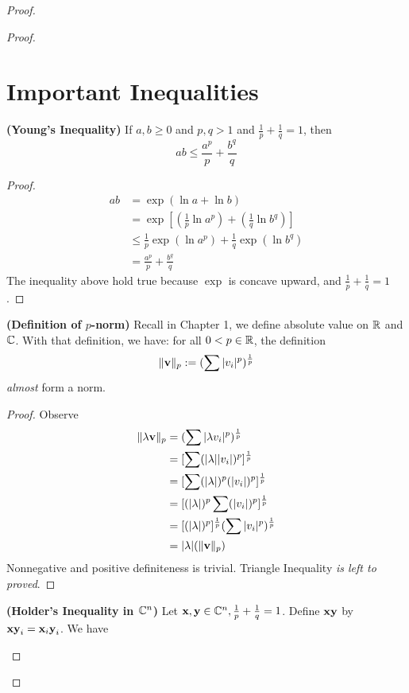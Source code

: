 \documentclass{report}
\begin{document}
\begin{proof}
\begin{proof}
\section{Important Inequalities}
\begin{theorem}
\label{5.1.1}
\textbf{(Young's Inequality)} If $a,b\geq 0$ and $p,q>1$ and  $\frac{1}{p}+\frac{1}{q}=1$, then
\begin{equation}
ab\leq \frac{a^p}{p}+\frac{b^q}{q}
\end{equation}
\end{theorem}
\begin{proof}
\begin{align}
  ab&=\exp(\ln a+ \ln b)\\
    &=\exp[(\frac{1}{p}\ln a^p)+(\frac{1}{q}\ln b^q)]\\
&\leq \frac{1}{p}\exp(\ln a^p)+\frac{1}{q}\exp(\ln b^q)\\
&= \frac{a^p}{p}+\frac{b^q}{q}
\end{align}
The inequality above hold true because  $\exp$ is concave upward, and $\frac{1}{p}+\frac{1}{q}=1$. 
\end{proof}
\begin{theorem}
\label{5.1.2}
\textbf{(Definition of $p$-norm)} Recall in Chapter 1, we define absolute value on $\mathbb{R}$ and  $\mathbb{C}$. With that definition, we have: for all $0<p \in \mathbb{R}$, the definition
\begin{equation}
  \| \textbf{v} \|_p:= (\sum |v_i|^p)^{\frac{1}{p}}
\end{equation}
\textit{almost} form a norm.
\end{theorem}
\begin{proof}
Observe 
\begin{align}
\| \lambda \textbf{v} \|_p&=(\sum |\lambda v_i|^p)^{\frac{1}{p}} \\
&=[\sum (|\lambda ||v_i|)^p]^{\frac{1}{p}}\\
&=[\sum (|\lambda |)^p(|v_i|)^p]^{\frac{1}{p}}\\
&=[(|\lambda |)^p\sum (|v_i|)^p]^{\frac{1}{p}}\\
&=[(|\lambda |)^p]^{\frac{1}{p}}(\sum |v_i|^p)^{\frac{1}{p}}\\
&=|\lambda |(\| \textbf{v} \|_p)
\end{align}
Nonnegative and positive definiteness is trivial. Triangle Inequality \textit{is left to proved}. 
\end{proof}
\begin{theorem}
\label{5.1.3}
\textbf{(Holder's Inequality in $\mathbb{C}^n$)} Let $\textbf{x},\textbf{y}\in \mathbb{C}^n,\frac{1}{p}+\frac{1}{q}=1$. Define $\textbf{xy}$ by $\textbf{xy}_i=\textbf{x}_i\textbf{y}_i$. We have

\end{theorem}
\end{proof}
\end{proof}
\end{document}
